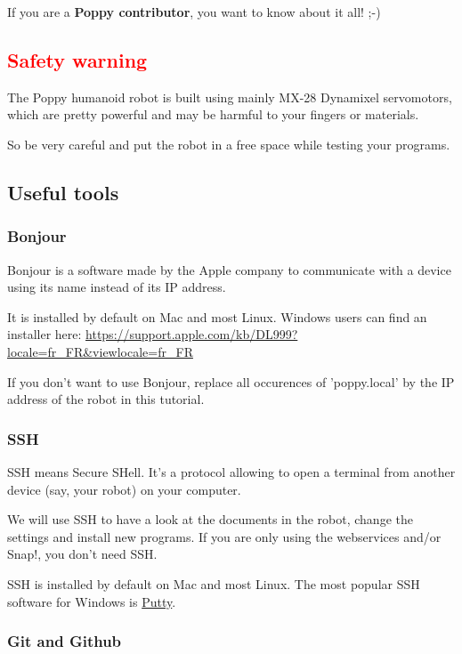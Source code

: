 \documentclass{article}
\begin{document}
If you are a \textbf{Poppy contributor}, you want to know about it all! ;-)

\subsection{\textcolor{red}{Safety warning}}

The Poppy humanoid robot is built using mainly MX-28 Dynamixel servomotors, which are pretty powerful and may be harmful to your fingers or materials.

So be very careful and put the robot in a free space while testing your programs.

\subsection{Useful tools}

\subsubsection{Bonjour}

Bonjour is a software made by the Apple company to communicate with a device using its name instead of its IP address.

It is installed by default on Mac and most Linux. Windows users can find an installer here: \url{https://support.apple.com/kb/DL999?locale=fr_FR&viewlocale=fr_FR}

If you don't want to use Bonjour, replace all occurences of 'poppy.local' by the IP address of the robot in this tutorial.

\subsubsection{SSH}

SSH means Secure SHell. It's a protocol allowing to open a terminal from another device (say, your robot) on your computer.

We will use SSH to have a look at the documents in the robot, change the settings and install new programs. If you are only using the webservices and/or Snap!, you don't need SSH.

SSH is installed by default on Mac and most Linux. The most popular SSH software for Windows is \href{http://www.putty.org/}{Putty}.

\subsubsection{Git and Github}
\end{document}
